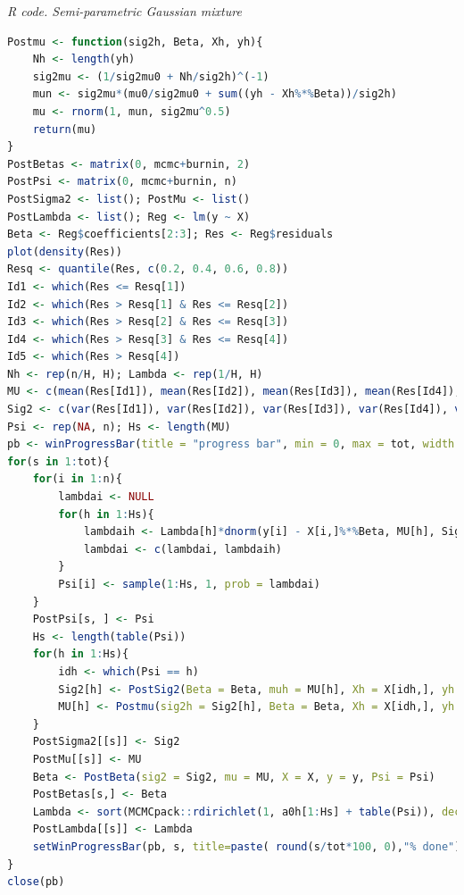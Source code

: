 \begin{enumerate}[leftmargin=*]
\begin{tcolorbox}[enhanced,width=4.67in,center upper,
	fontupper=\large\bfseries,drop shadow southwest,sharp corners]
	\textit{R code. Semi-parametric Gaussian mixture}
	\begin{VF}
		\begin{lstlisting}[language=R]
Postmu <- function(sig2h, Beta, Xh, yh){
	Nh <- length(yh)
	sig2mu <- (1/sig2mu0 + Nh/sig2h)^(-1)
	mun <- sig2mu*(mu0/sig2mu0 + sum((yh - Xh%*%Beta))/sig2h)
	mu <- rnorm(1, mun, sig2mu^0.5)
	return(mu)
}
PostBetas <- matrix(0, mcmc+burnin, 2)
PostPsi <- matrix(0, mcmc+burnin, n)
PostSigma2 <- list(); PostMu <- list()
PostLambda <- list(); Reg <- lm(y ~ X)
Beta <- Reg$coefficients[2:3]; Res <- Reg$residuals
plot(density(Res))
Resq <- quantile(Res, c(0.2, 0.4, 0.6, 0.8))
Id1 <- which(Res <= Resq[1])
Id2 <- which(Res > Resq[1] & Res <= Resq[2])
Id3 <- which(Res > Resq[2] & Res <= Resq[3])
Id4 <- which(Res > Resq[3] & Res <= Resq[4])
Id5 <- which(Res > Resq[4])
Nh <- rep(n/H, H); Lambda <- rep(1/H, H)
MU <- c(mean(Res[Id1]), mean(Res[Id2]), mean(Res[Id3]), mean(Res[Id4]), mean(Res[Id5]))
Sig2 <- c(var(Res[Id1]), var(Res[Id2]), var(Res[Id3]), var(Res[Id4]), var(Res[Id5]))
Psi <- rep(NA, n); Hs <- length(MU)
pb <- winProgressBar(title = "progress bar", min = 0, max = tot, width = 300)
for(s in 1:tot){
	for(i in 1:n){
		lambdai <- NULL
		for(h in 1:Hs){
			lambdaih <- Lambda[h]*dnorm(y[i] - X[i,]%*%Beta, MU[h], Sig2[h]^0.5)
			lambdai <- c(lambdai, lambdaih)
		}
		Psi[i] <- sample(1:Hs, 1, prob = lambdai)
	}
	PostPsi[s, ] <- Psi
	Hs <- length(table(Psi))
	for(h in 1:Hs){
		idh <- which(Psi == h)
		Sig2[h] <- PostSig2(Beta = Beta, muh = MU[h], Xh = X[idh,], yh = y[idh])
		MU[h] <- Postmu(sig2h = Sig2[h], Beta = Beta, Xh = X[idh,], yh = y[idh])
	}
	PostSigma2[[s]] <- Sig2
	PostMu[[s]] <- MU 
	Beta <- PostBeta(sig2 = Sig2, mu = MU, X = X, y = y, Psi = Psi)
	PostBetas[s,] <- Beta
	Lambda <- sort(MCMCpack::rdirichlet(1, a0h[1:Hs] + table(Psi)), decreasing = TRUE)
	PostLambda[[s]] <- Lambda
	setWinProgressBar(pb, s, title=paste( round(s/tot*100, 0),"% done"))
}
close(pb)
\end{lstlisting}
	\end{VF}
\end{tcolorbox}


\end{enumerate}
